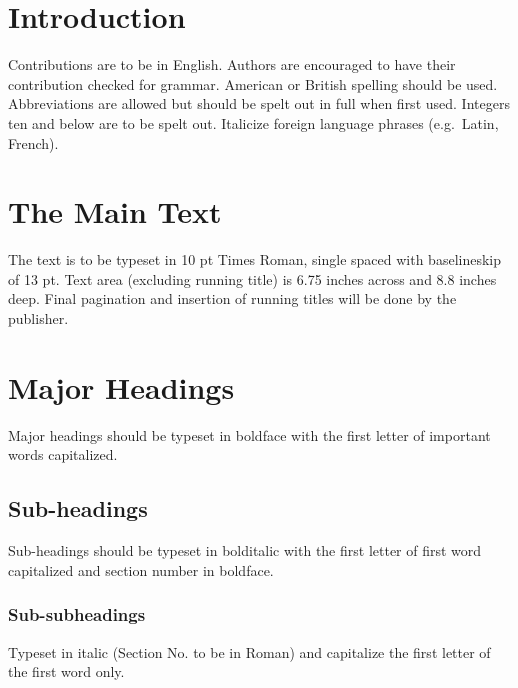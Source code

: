\documentclass[11pt,twoside]{article}
\begin{document}
\vspace*{7pt}\textlineskip
\begin{multicols}{2}

\section{Introduction}

Contributions are to be in English. Authors are encouraged to have their contribution checked for grammar. American or British spelling should be used. Abbreviations are allowed but should be spelt out in full when first used. Integers ten and below are to be spelt out. Italicize foreign language phrases (e.g.~Latin, French).

\section{The Main Text}

The text is to be typeset in 10 pt Times Roman, single spaced with baselineskip of 13 pt. Text area (excluding running title) is 6.75 inches across and 8.8 inches deep. Final pagination and insertion of running titles will be done by the publisher.

\section{Major Headings}

Major headings should be typeset in boldface with the first letter of important words capitalized.

\subsection{Sub-headings}
Sub-headings should be typeset in bolditalic with the first letter of first word capitalized and section number in boldface.

\subsubsection{Sub-subheadings}

Typeset in italic (Section No. to be in Roman) and capitalize the first letter of the first word only.


\end{multicols}
\end{document}
